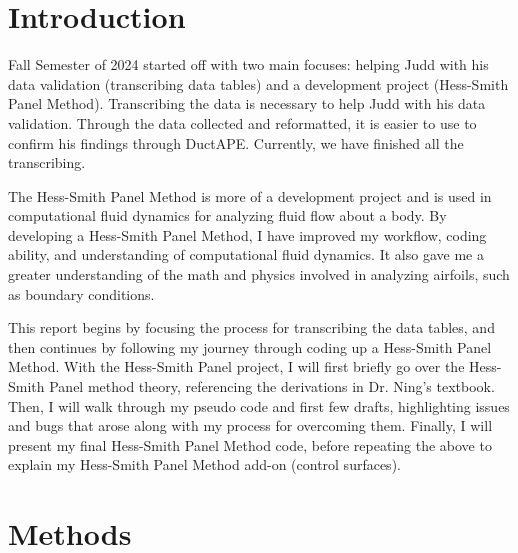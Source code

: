 \documentclass[journal]{new-aiaa} %
\begin{document}
\section{Introduction}
\label{sec:intro}

Fall Semester of 2024 started off with two main focuses: helping Judd with his data validation (transcribing data tables) and a development project (Hess-Smith Panel Method). Transcribing the data is necessary to help Judd with his data validation. Through the data collected and reformatted, it is easier to use to confirm his findings through DuctAPE. Currently, we have finished all the transcribing.

The Hess-Smith Panel Method is more of a development project and is used in computational fluid dynamics for analyzing fluid flow about a body. By developing a Hess-Smith Panel Method, I have improved my workflow, coding ability, and understanding of computational fluid dynamics. It also gave me a greater understanding of the math and physics involved in analyzing airfoils, such as boundary conditions.

This report begins by focusing the process for transcribing the data tables, and then continues by following my journey through coding up a Hess-Smith Panel Method. With the Hess-Smith Panel project, I will first briefly go over the Hess-Smith Panel method theory, referencing the derivations in Dr. Ning's textbook. Then, I will walk through my pseudo code and first few drafts, highlighting issues and bugs that arose along with my process for overcoming them. Finally, I will present my final Hess-Smith Panel Method code, before repeating the above to explain my Hess-Smith Panel Method add-on (control surfaces).


\section{Methods}
\label{sec:methods}
\end{document}
